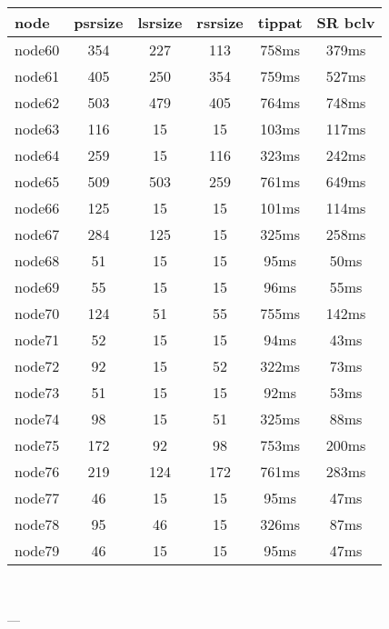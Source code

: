\begin{tabular}{|l|c|c|c|c|c|}
\hline node & psrsize & lsrsize & rsrsize   & tippat & SR bclv\\
    \hline node60 & 354 & 227 & 113 & 758ms & 379ms\\
    \hline node61 & 405 & 250 & 354 & 759ms & 527ms\\
    \hline node62 & 503 & 479 & 405 & 764ms & 748ms\\
    \hline node63 & 116 & 15 & 15 & 103ms & 117ms\\
    \hline node64 & 259 & 15 & 116 & 323ms & 242ms\\
    \hline node65 & 509 & 503 & 259 & 761ms & 649ms\\
    \hline node66 & 125 & 15 & 15 & 101ms & 114ms\\
    \hline node67 & 284 & 125 & 15 & 325ms & 258ms\\
    \hline node68 & 51 & 15 & 15 & 95ms & 50ms\\
    \hline node69 & 55 & 15 & 15 & 96ms & 55ms\\
    \hline node70 & 124 & 51 & 55 & 755ms & 142ms\\
    \hline node71 & 52 & 15 & 15 & 94ms & 43ms\\
    \hline node72 & 92 & 15 & 52 & 322ms & 73ms\\
    \hline node73 & 51 & 15 & 15 & 92ms & 53ms\\
    \hline node74 & 98 & 15 & 51 & 325ms & 88ms\\
    \hline node75 & 172 & 92 & 98 & 753ms & 200ms\\
    \hline node76 & 219 & 124 & 172 & 761ms & 283ms\\
    \hline node77 & 46 & 15 & 15 & 95ms & 47ms\\
    \hline node78 & 95 & 46 & 15 & 326ms & 87ms\\
    \hline node79 & 46 & 15 & 15 & 95ms & 47ms\\

\hline
\end{tabular} \

---


